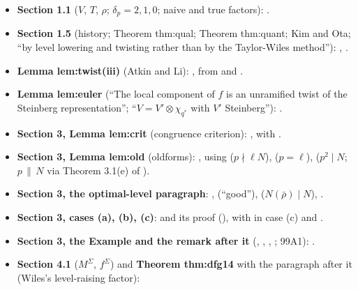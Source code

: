 \begin{itemize}
\item \textbf{Section 1.1} ($V$, $T$, $\rho$; $\delta_p=2,1,0$; naive and true factors): .
\item \textbf{Section 1.5} (history; Theorem thm:qual; Theorem thm:quant; Kim and Ota; ``by level lowering and twisting rather than by the Taylor-Wiles method''):
, .
\item \textbf{Lemma lem:twist(iii)} (Atkin and Li): , from  and .
\item \textbf{Lemma lem:euler} (``The local component of $f$ is an unramified twist of the Steinberg representation''; ``$V=V'\otimes\chi_{q^*}$ with $V'$ Steinberg''):
.
\item \textbf{Section 3, Lemma lem:crit} (congruence criterion): , with .
\item \textbf{Section 3, Lemma lem:old} (oldforms): , using  ($p\nmid\ell N$),
 ($p=\ell$),  ($p^2\mid N$; $p\,\|\,N$ via Theorem 3.1(e) of \cite{DDT}).
\item \textbf{Section 3, the optimal-level paragraph}: ,  (``good''),
 ($N(\bar\rho)\mid N$), .
\item \textbf{Section 3, cases (a), (b), (c)}:  and its proof (), with  in case (c) and
.
\item \textbf{Section 3, the Example and the remark after it} (, , , ; 99A1): .
\item \textbf{Section 4.1} ($M^\Sigma$, $f^\Sigma$) and \textbf{Theorem thm:dfg14} with the paragraph after it (Wiles's level-raising factor):

\end{itemize}
